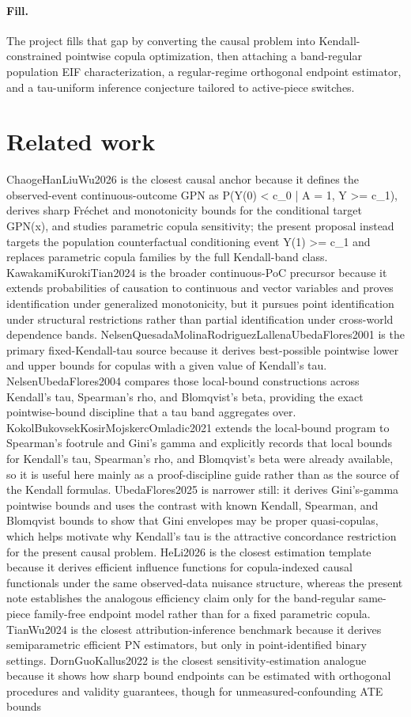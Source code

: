 \documentclass{article}
\begin{document}
\paragraph{Fill.} The project fills that gap by converting the causal problem into Kendall-constrained pointwise copula optimization, then attaching a band-regular population EIF characterization, a regular-regime orthogonal endpoint estimator, and a tau-uniform inference conjecture tailored to active-piece switches.

\section{Related work}

ChaogeHanLiuWu2026 is the closest causal anchor because it defines the observed-event continuous-outcome GPN as P(Y(0) < c_0 | A = 1, Y >= c_1), derives sharp Fréchet and monotonicity bounds for the conditional target GPN(x), and studies parametric copula sensitivity; the present proposal instead targets the population counterfactual conditioning event Y(1) >= c_1 and replaces parametric copula families by the full Kendall-band class. KawakamiKurokiTian2024 is the broader continuous-PoC precursor because it extends probabilities of causation to continuous and vector variables and proves identification under generalized monotonicity, but it pursues point identification under structural restrictions rather than partial identification under cross-world dependence bands. NelsenQuesadaMolinaRodriguezLallenaUbedaFlores2001 is the primary fixed-Kendall-tau source because it derives best-possible pointwise lower and upper bounds for copulas with a given value of Kendall's tau. NelsenUbedaFlores2004 compares those local-bound constructions across Kendall's tau, Spearman's rho, and Blomqvist's beta, providing the exact pointwise-bound discipline that a tau band aggregates over. KokolBukovsekKosirMojskercOmladic2021 extends the local-bound program to Spearman's footrule and Gini's gamma and explicitly records that local bounds for Kendall's tau, Spearman's rho, and Blomqvist's beta were already available, so it is useful here mainly as a proof-discipline guide rather than as the source of the Kendall formulas. UbedaFlores2025 is narrower still: it derives Gini's-gamma pointwise bounds and uses the contrast with known Kendall, Spearman, and Blomqvist bounds to show that Gini envelopes may be proper quasi-copulas, which helps motivate why Kendall's tau is the attractive concordance restriction for the present causal problem. HeLi2026 is the closest estimation template because it derives efficient influence functions for copula-indexed causal functionals under the same observed-data nuisance structure, whereas the present note establishes the analogous efficiency claim only for the band-regular same-piece family-free endpoint model rather than for a fixed parametric copula. TianWu2024 is the closest attribution-inference benchmark because it derives semiparametric efficient PN estimators, but only in point-identified binary settings. DornGuoKallus2022 is the closest sensitivity-estimation analogue because it shows how sharp bound endpoints can be estimated with orthogonal procedures and validity guarantees, though for unmeasured-confounding ATE bounds 
\end{document}

